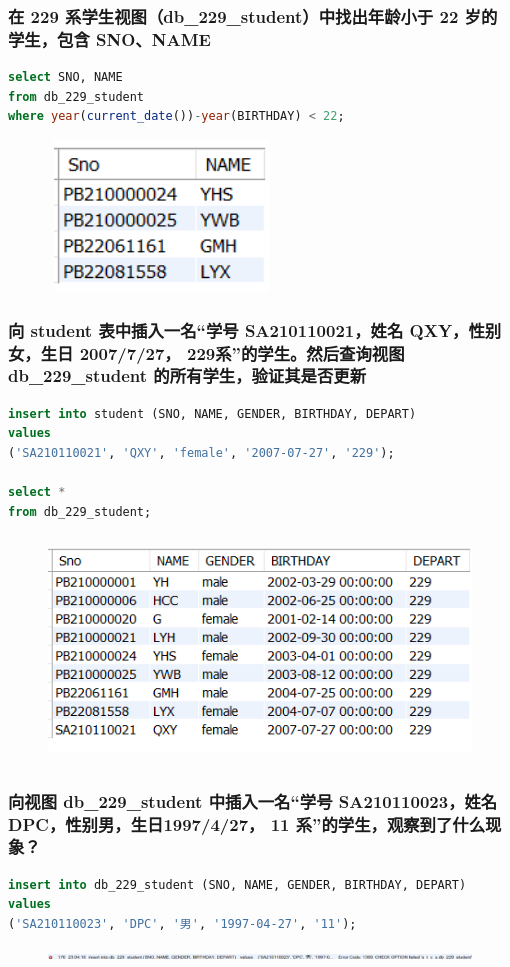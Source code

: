 \documentclass{ctexart}
\begin{document}
\subsubsection{在 229 系学生视图（db\_229\_student）中找出年龄小于 22 岁的学生，包含 SNO、NAME}
\begin{lstlisting}[language=sql]
select SNO, NAME
from db_229_student
where year(current_date())-year(BIRTHDAY) < 22;
\end{lstlisting}
\begin{figure}[H]
	\centering 
	\includegraphics[height=4cm,width=6cm]{48.png}
	\end{figure}
\subsubsection{向 student 表中插入一名“学号 SA210110021，姓名 QXY，性别女，生日 2007/7/27， 229系”的学生。然后查询视图 db\_229\_student 的所有学生，验证其是否更新}
\begin{lstlisting}[language=sql]
insert into student (SNO, NAME, GENDER, BIRTHDAY, DEPART)  
values   
('SA210110021', 'QXY', 'female', '2007-07-27', '229');

select *
from db_229_student;
\end{lstlisting}
\begin{figure}[H]
	\centering 
	\includegraphics[height=6cm,width=14cm]{49.png}
	\end{figure}
\subsubsection{向视图 db\_229\_student 中插入一名“学号 SA210110023，姓名 DPC，性别男，生日1997/4/27， 11 系”的学生，观察到了什么现象？}
\begin{lstlisting}[language=sql]
insert into db_229_student (SNO, NAME, GENDER, BIRTHDAY, DEPART)  
values   
('SA210110023', 'DPC', '男', '1997-04-27', '11');

\end{lstlisting}
\begin{figure}[H]
	\centering 
	\includegraphics[height=0.3cm,width=16cm]{50.png}
	\end{figure}
\end{document}
